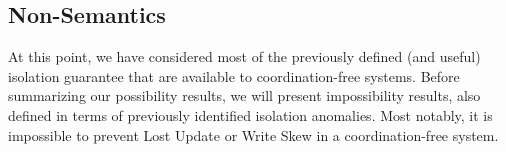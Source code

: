 \subsection{Non-\IConfluent Semantics}
\label{sec:unachievable-hat}

At this point, we have considered most of the previously defined (and useful)
isolation guarantee that are available to coordination-free
systems. Before summarizing our possibility results, we will present
impossibility results, also defined in terms of previously identified
isolation anomalies. Most notably, it is impossible to prevent Lost
Update or Write Skew in a coordination-free system.

